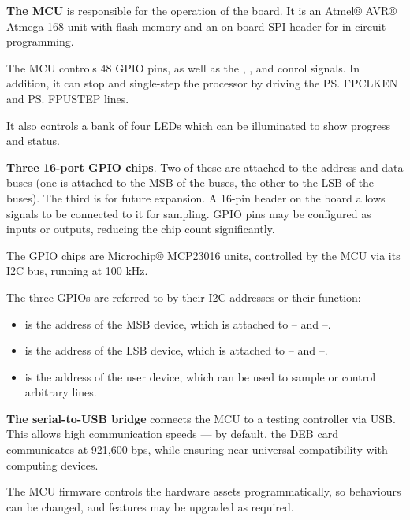 \begin{description}
\item{\bfseries The \gls{MCU}} is responsible for the operation of the
  board. It is an Atmel® AVR® Atmega 168 unit with flash memory and an
  on-board SPI header for in-circuit programming.

  The \gls{MCU} controls 48 \gls{GPIO} pins, as well as the ,
  ,  and  conrol signals. In addition, it can stop
  and single-step the processor by driving the \ps{FPCLKEN} and
  \ps{FPUSTEP} lines.

  It also controls a bank of four LEDs which can be
    illuminated to show progress and status.

\item{\bfseries Three 16-port \gls{GPIO} chips}. Two of these are attached
  to the address and data buses (one is attached to the MSB of the
  buses, the other to the LSB of the buses). The third is for future
  expansion. A 16-pin header on the board allows signals to be
  connected to it for sampling. GPIO pins may be configured as inputs
  or outputs, reducing the chip count significantly.

  The \gls{GPIO} chips are Microchip® MCP23016 units, controlled by the
  \gls{MCU} via its \gls{I2C} bus, running at 100 kHz.

  The three GPIOs are referred to by their \gls{I2C} addresses or their function:
  
  \begin{itemize}
  \item {} is the address of the \gls{MSB} device, which is
    attached to – and –.
  \item {} is the address of the \gls{LSB} device, which is
    attached to – and –.
  \item {} is the address of the user device, which can be used to
    sample or control arbitrary lines.
  \end{itemize}

\item{\bfseries The serial-to-USB bridge} connects the \gls{MCU} to a
  testing controller via \gls{USB}. This allows high communication
  speeds — by default, the DEB card communicates at 921,600 bps, while
  ensuring near-universal compatibility with computing devices.
\end{description}

The \gls{MCU} firmware controls the hardware assets programmatically,
so behaviours can be changed, and features may be upgraded as
required.

